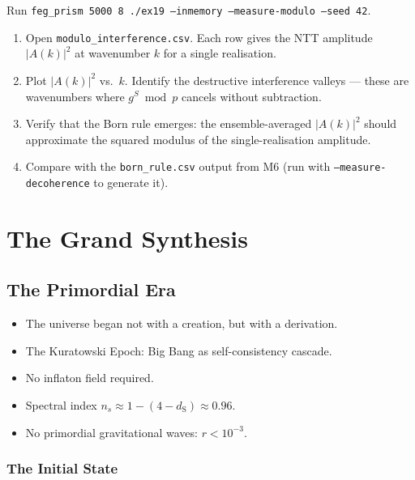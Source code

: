 \documentclass[11pt, a4paper, openany]{book}
\newcommand{\dS}{d_{\mathrm{S}}}
\newenvironment{introduction}[1][Modulo Overview]{%
  \begin{tcolorbox}[
    enhanced,colback=structure!5,colframe=structure,
    colbacktitle=structure,coltitle=white,
    fonttitle=\small\bfseries,title={#1},
    arc=2pt,boxrule=0.7pt,
    left=8pt,right=8pt,top=6pt,bottom=6pt,
    before skip=12pt,after skip=12pt
  ]\itshape\begin{itemize}[leftmargin=*,itemsep=2pt,parsep=0pt]
}{%
  \end{itemize}\end{tcolorbox}
}
\begin{document}
\begin{simulation}
Run \texttt{feg\_prism 5000 8 ./ex19 --inmemory --measure-modulo --seed 42}.
\begin{enumerate}
\item Open \texttt{modulo\_interference.csv}. Each row gives the NTT amplitude $|A(k)|^2$ at wavenumber $k$ for a single realisation.
\item Plot $|A(k)|^2$ vs.\ $k$. Identify the destructive interference valleys --- these are wavenumbers where $g^S \bmod p$ cancels without subtraction.
\item Verify that the Born rule emerges: the ensemble-averaged $|A(k)|^2$ should approximate the squared modulus of the single-realisation amplitude.
\item Compare with the \texttt{born\_rule.csv} output from M6 (run with \texttt{--measure-decoherence} to generate it).
\end{enumerate}
\end{simulation}


\part{The Grand Synthesis}

\chapter{The Primordial Era}\label{ch:primordial}

\begin{introduction}
  \item The universe began not with a creation, but with a derivation.
  \item The Kuratowski Epoch: Big Bang as self-consistency cascade.
  \item No inflaton field required.
  \item Spectral index $n_s \approx 1 - (4 - \dS) \approx 0.96$.
  \item No primordial gravitational waves: $r < 10^{-3}$.
\end{introduction}

\section{The Initial State}\label{sec:initial}
\end{document}
